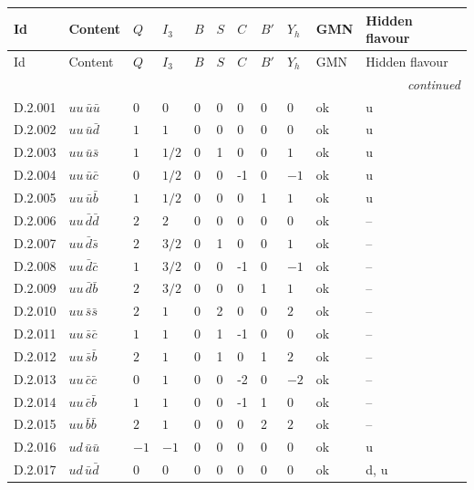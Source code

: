 {\scriptsize\setlength{\tabcolsep}{3pt}
\begin{longtable}{@{}llllllllll>{\raggedright\arraybackslash}p{2.0cm}@{}}
\toprule
Id & Content & $Q$ & $I_3$ & $B$ & $S$ & $C$ & $B'$ & $Y_h$ & GMN & Hidden flavour \\
\midrule\endfirsthead
\toprule
Id & Content & $Q$ & $I_3$ & $B$ & $S$ & $C$ & $B'$ & $Y_h$ & GMN & Hidden flavour \\
\midrule\endhead
\midrule\multicolumn{11}{r}{\emph{continued}}\\\endfoot
\bottomrule\endlastfoot
D.2.001 & $uu\,\bar{u}\bar{u}$ & $0$ & $0$ & $0$ & 0 & 0 & 0 & $0$ & ok & u \\
D.2.002 & $uu\,\bar{u}\bar{d}$ & $1$ & $1$ & $0$ & 0 & 0 & 0 & $0$ & ok & u \\
D.2.003 & $uu\,\bar{u}\bar{s}$ & $1$ & $1/2$ & $0$ & 1 & 0 & 0 & $1$ & ok & u \\
D.2.004 & $uu\,\bar{u}\bar{c}$ & $0$ & $1/2$ & $0$ & 0 & -1 & 0 & $-1$ & ok & u \\
D.2.005 & $uu\,\bar{u}\bar{b}$ & $1$ & $1/2$ & $0$ & 0 & 0 & 1 & $1$ & ok & u \\
D.2.006 & $uu\,\bar{d}\bar{d}$ & $2$ & $2$ & $0$ & 0 & 0 & 0 & $0$ & ok & -- \\
D.2.007 & $uu\,\bar{d}\bar{s}$ & $2$ & $3/2$ & $0$ & 1 & 0 & 0 & $1$ & ok & -- \\
D.2.008 & $uu\,\bar{d}\bar{c}$ & $1$ & $3/2$ & $0$ & 0 & -1 & 0 & $-1$ & ok & -- \\
D.2.009 & $uu\,\bar{d}\bar{b}$ & $2$ & $3/2$ & $0$ & 0 & 0 & 1 & $1$ & ok & -- \\
D.2.010 & $uu\,\bar{s}\bar{s}$ & $2$ & $1$ & $0$ & 2 & 0 & 0 & $2$ & ok & -- \\
D.2.011 & $uu\,\bar{s}\bar{c}$ & $1$ & $1$ & $0$ & 1 & -1 & 0 & $0$ & ok & -- \\
D.2.012 & $uu\,\bar{s}\bar{b}$ & $2$ & $1$ & $0$ & 1 & 0 & 1 & $2$ & ok & -- \\
D.2.013 & $uu\,\bar{c}\bar{c}$ & $0$ & $1$ & $0$ & 0 & -2 & 0 & $-2$ & ok & -- \\
D.2.014 & $uu\,\bar{c}\bar{b}$ & $1$ & $1$ & $0$ & 0 & -1 & 1 & $0$ & ok & -- \\
D.2.015 & $uu\,\bar{b}\bar{b}$ & $2$ & $1$ & $0$ & 0 & 0 & 2 & $2$ & ok & -- \\
D.2.016 & $ud\,\bar{u}\bar{u}$ & $-1$ & $-1$ & $0$ & 0 & 0 & 0 & $0$ & ok & u \\
D.2.017 & $ud\,\bar{u}\bar{d}$ & $0$ & $0$ & $0$ & 0 & 0 & 0 & $0$ & ok & d, u \\

\end{longtable}}

